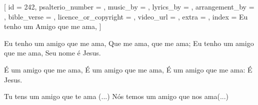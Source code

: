 
[
    id                     = {242},
    psalterio_number       = {},
    music_by               = {},
    lyrics_by              = {},
    arrangement_by         = {},
    bible_verse            = {},
    licence_or_copyright   = {},
    video_url              = {},
    extra                  = {},
    index                  = {Eu tenho um Amigo que me ama},
]


\beginverse
Eu tenho um amigo que me ama,
Que me ama, que me ama;
Eu tenho um amigo que me ama,
Seu nome é Jesus.
\endverse


\beginchorus
É um amigo que me ama,
É um amigo que me ama,
É um amigo que me ama: É Jesus.
\endchorus


\beginverse
Tu tens um amigo que te ama (...)
Nós temos um amigo que nos ama(...)
\endverse


\endsong
